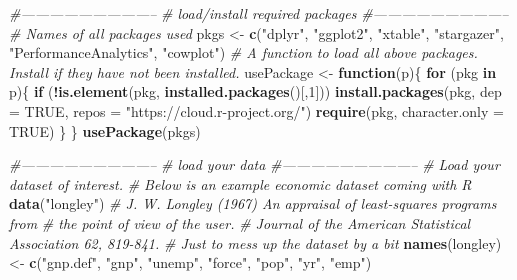 \documentclass[11pt,]{article}
\newenvironment{Shaded}{\begin{snugshade}}{\end{snugshade}}
\newcommand{\KeywordTok}[1]{\textcolor[rgb]{0.13,0.29,0.53}{\textbf{#1}}}
\newcommand{\DataTypeTok}[1]{\textcolor[rgb]{0.13,0.29,0.53}{#1}}
\newcommand{\DecValTok}[1]{\textcolor[rgb]{0.00,0.00,0.81}{#1}}
\newcommand{\StringTok}[1]{\textcolor[rgb]{0.31,0.60,0.02}{#1}}
\newcommand{\CommentTok}[1]{\textcolor[rgb]{0.56,0.35,0.01}{\textit{#1}}}
\newcommand{\OtherTok}[1]{\textcolor[rgb]{0.56,0.35,0.01}{#1}}
\newcommand{\ControlFlowTok}[1]{\textcolor[rgb]{0.13,0.29,0.53}{\textbf{#1}}}
\newcommand{\OperatorTok}[1]{\textcolor[rgb]{0.81,0.36,0.00}{\textbf{#1}}}
\newcommand{\NormalTok}[1]{#1}
\begin{document}
\begin{Shaded}
\begin{Highlighting}[]
\CommentTok{#-----------------------------}
\CommentTok{# load/install required packages}
\CommentTok{#-----------------------------}
\CommentTok{# Names of all packages used}
\NormalTok{  pkgs <-}\StringTok{ }\KeywordTok{c}\NormalTok{(}\StringTok{"dplyr"}\NormalTok{, }\StringTok{"ggplot2"}\NormalTok{, }\StringTok{"xtable"}\NormalTok{, }\StringTok{"stargazer"}\NormalTok{, }\StringTok{"PerformanceAnalytics"}\NormalTok{, }\StringTok{"cowplot"}\NormalTok{)}
\CommentTok{# A function to load all above packages. Install if they have not been installed.}
\NormalTok{  usePackage <-}\StringTok{ }\ControlFlowTok{function}\NormalTok{(p)\{}
    \ControlFlowTok{for}\NormalTok{ (pkg }\ControlFlowTok{in}\NormalTok{ p)\{}
      \ControlFlowTok{if}\NormalTok{ (}\OperatorTok{!}\KeywordTok{is.element}\NormalTok{(pkg, }\KeywordTok{installed.packages}\NormalTok{()[,}\DecValTok{1}\NormalTok{]))}
        \KeywordTok{install.packages}\NormalTok{(pkg, }\DataTypeTok{dep =} \OtherTok{TRUE}\NormalTok{, }\DataTypeTok{repos =} \StringTok{"https://cloud.r-project.org/"}\NormalTok{)}
      \KeywordTok{require}\NormalTok{(pkg, }\DataTypeTok{character.only =} \OtherTok{TRUE}\NormalTok{)}
\NormalTok{    \}}
\NormalTok{  \}}
  \KeywordTok{usePackage}\NormalTok{(pkgs)}
\end{Highlighting}
\end{Shaded}

\normalsize

\tiny

\begin{Shaded}
\begin{Highlighting}[]
\CommentTok{#-----------------------------}
\CommentTok{# load your data}
\CommentTok{#-----------------------------}
  \CommentTok{# Load your dataset of interest. }
  \CommentTok{# Below is an example economic dataset coming with R}
    \KeywordTok{data}\NormalTok{(}\StringTok{"longley"}\NormalTok{)}
      \CommentTok{# J. W. Longley (1967) An appraisal of least-squares programs from }
      \CommentTok{# the point of view of the user. }
      \CommentTok{# Journal of the American Statistical Association 62, 819-841.}
  \CommentTok{# Just to mess up the dataset by a bit}
    \KeywordTok{names}\NormalTok{(longley) <-}\StringTok{ }\KeywordTok{c}\NormalTok{(}\StringTok{"gnp.def"}\NormalTok{, }\StringTok{"gnp"}\NormalTok{, }\StringTok{"unemp"}\NormalTok{, }\StringTok{"force"}\NormalTok{, }\StringTok{"pop"}\NormalTok{, }\StringTok{"yr"}\NormalTok{, }\StringTok{"emp"}\NormalTok{)}
\end{Highlighting}
\end{Shaded}
\end{document}
